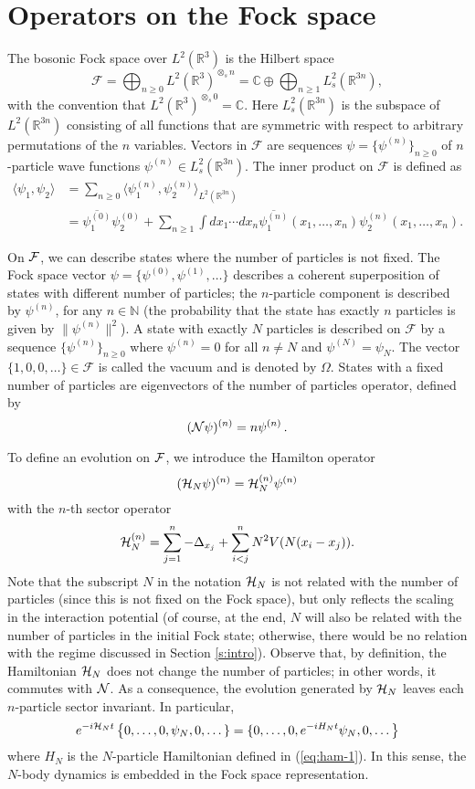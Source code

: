 \documentclass[11pt,a4paper]{article}
\newcommand{\bN}{{\mathbb N}}
\newcommand{\cF}{{\cal F}}
\newcommand{\cH}{{\cal H}}
\newcommand{\cN}{{\cal N}}
\newcommand{\R}{\mathbb{R}}
\begin{document}
\section{Operators on the Fock space}
\label{sec:fock}

The bosonic Fock space over $L^2(\R^3)$ is the Hilbert space
\[
  \mathcal{F} = \bigoplus_{n \ge 0} L^2(\R^3)^{\otimes_s n} = \mathbb{C}
  \oplus \bigoplus_{n \ge 1} L^2_s(\R^{3n}),
\]
with the convention that $L^2(\R^3)^{\otimes_s 0} = \mathbb{C}$. Here
$L^2_s (\R^{3n})$ is the subspace of $L^2(\R^{3n})$ consisting of all functions
that are symmetric with respect to arbitrary permutations of the $n$
variables. Vectors in $\mathcal{F}$ are sequences $\psi = \{\psi^{(n)}\}_{n
\ge 0}$ of $n$-particle wave functions $\psi^{(n)} \in L^2_s(\R^{3n})$. The
inner product on $\mathcal{F}$ is defined as
\begin{align*}
  \langle \psi_1, \psi_2 \rangle & = \sum_{n \ge 0} \langle \psi_1^{(n)},
  \psi_2^{(n)} \rangle_{L^2(\R^{3n})} \\
  & = \overline{\psi_1^{(0)}} \psi_2^{(0)} + \sum_{n \ge 1} \int dx_1 \cdots
  dx_n \overline{\psi_1^{(n)}}(x_1, \dots, x_n) \psi_2^{(n)}(x_1, \dots, x_n).
\end{align*}

On $\cF$, we can describe states where the number of particles is not fixed. The Fock space 
vector $\psi = \{ \psi^{(0)}, \psi^{(1)}, \dots  \}$ describes a coherent superposition 
of states with different number of particles; the $n$-particle component is described by $\psi^{(n)}$, for any $n \in \bN$ (the probability that the state has exactly $n$ particles is given by $\| \psi^{(n)} \|^2$).  
A state with exactly $N$ particles is described on
$\mathcal{F}$ by a sequence $\{\psi^{(n)}\}_{n \ge 0}$ where $\psi^{(n)} =
0$ for all $n \neq N$ and $\psi^{(N)} = \psi_N$. The vector $\{1, 0, 0, \dots
\} \in \mathcal{F}$ is called the vacuum and is denoted by $\Omega$.
States with a fixed number of particles are eigenvectors of the number of particles operator, defined by
\[ (\cN \psi)^{(n)} = n \psi^{(n)} \, . \]

To define an evolution on $\cF$, we introduce the Hamilton operator 
\[ (\cH_N \psi)^{(n)} = \cH_N^{(n)} \psi^{(n)} \]
with the $n$-th sector operator 
\[ \cH_N^{(n)} = \sum_{j=1}^n -\Delta_{x_j} + \sum_{i<j}^n N^2 V(N (x_i - x_j)). \]
Note that the subscript $N$ in the notation $\cH_N$ is not related with the number of particles (since this is not fixed on the Fock space), but only reflects the scaling in the interaction potential (of course, at the end, $N$ will also be related with the number of particles in the initial Fock state; otherwise, there would be no relation with the regime discussed in Section \ref{s:intro}). Observe that, by definition, the Hamiltonian $\cH_N$ does not change the number of particles; in other words, it commutes with $\cN$. As a consequence, the evolution generated by $\cH_N$ leaves each $n$-particle sector invariant. In particular, 
\[ e^{-i\cH_N t}  \left\{ 0, \dots , 0, \psi_N , 0 ,\dots \} = \{ 0, \dots, 0, e^{-iH_N t} \psi_N , 0 ,\dots \right\} \]
where $H_N$ is the $N$-particle Hamiltonian defined in (\ref{eq:ham-1}). In this sense, the $N$-body dynamics is embedded in the Fock space representation. 
\end{document}
